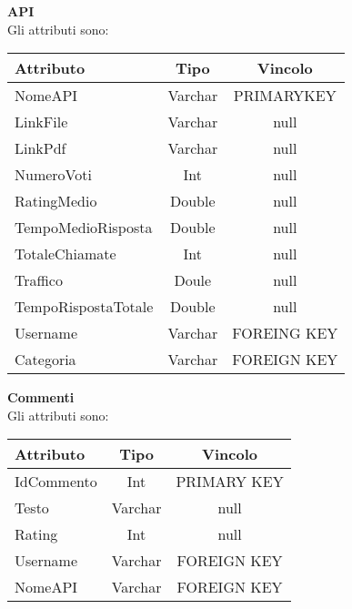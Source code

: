{{		\textbf{API}\\
			Gli attributi sono:
			\begin{center}
			\begin{tabular}{lcc}
				\textbf{Attributo}&\textbf{Tipo}&\textbf{Vincolo}\\ \hline
				NomeAPI&Varchar&PRIMARYKEY\\
				LinkFile&Varchar&null \\
				LinkPdf&Varchar&null \\
				NumeroVoti&Int&null \\
				RatingMedio&Double&null \\
				TempoMedioRisposta&Double&null \\
				TotaleChiamate&Int&null \\
				Traffico&Doule&null \\
				TempoRispostaTotale&Double&null \\
				Username&Varchar&FOREING KEY\\
				Categoria&Varchar&FOREIGN KEY\\
			\end{tabular}
			\end{center}
			
		\textbf{Commenti}\\
			Gli attributi sono:
			\begin{center}
			\begin{tabular}{lcc}
				\textbf{Attributo}&\textbf{Tipo}&\textbf{Vincolo}\\ \hline
				IdCommento&Int&PRIMARY KEY\\
				Testo&Varchar&null \\
				Rating&Int&null \\
				Username&Varchar&FOREIGN KEY\\
				NomeAPI&Varchar&FOREIGN KEY\\
			\end{tabular}
			\end{center}
		
}}

